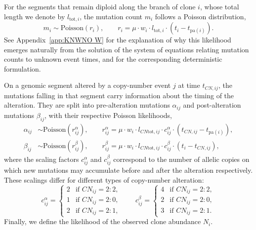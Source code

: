 For the segments that remain diploid along the branch of clone $i$, whose total length
we denote by $l_{\mathrm{tot},i}$, the mutation count $m_i$ follows a Poisson
distribution,
%
\begin{equation}
    m_i \sim \mathrm{Poisson}(r_i), \qquad
    r_i = \mu \cdot w_i \cdot l_{\mathrm{tot},i} \cdot (t_i - t_{\mathrm{pa}(i)}).
\end{equation}
%
See Appendix~\ref{app:KNWNO W} for the explanation of why this likelihood emerges
naturally from the solution of the system of equations relating mutation counts to
unknown event times, and for the corresponding deterministic formulation.

On a genomic segment altered by a copy-number event $j$ at time $t_{CN,ij}$, the
mutations falling in that segment carry information about the timing of the alteration.
They are split into pre-alteration mutations $\alpha_{ij}$ and post-alteration
mutations $\beta_{ij}$, with their respective Poisson likelihoods,
%
\begin{align}
    \alpha_{ij} &\sim \mathrm{Poisson}(r^\alpha_{ij}), \qquad
    r^\alpha_{ij} = \mu \cdot w_i \cdot l_{CN\mathrm{tot},ij} \cdot c^\alpha_{ij}
    \cdot (t_{CN,ij} - t_{\mathrm{pa}(i)}), \\[4pt]
    \beta_{ij} &\sim \mathrm{Poisson}(r^\beta_{ij}), \qquad
    r^\beta_{ij} = \mu \cdot w_i \cdot l_{CN\mathrm{tot},ij} \cdot c^\beta_{ij}
    \cdot (t_i - t_{CN,ij}),
\end{align}
%
where the scaling factors $c^\alpha_{ij}$ and $c^\beta_{ij}$ correspond to the
number of allelic copies on which new mutations may accumulate before and after
the alteration respectively. These scalings differ for different types of
copy-number alteration:
%
\begin{equation}
    c^\alpha_{ij} = \begin{cases} 
    2 & \text{if } CN_{ij} = 2\!:\!2, \\ 
    1 & \text{if } CN_{ij} = 2\!:\!0, \\ 
    2 & \text{if } CN_{ij} = 2\!:\!1,
    \end{cases}
    \qquad
    c^\beta_{ij} = \begin{cases} 
    4 & \text{if } CN_{ij} = 2\!:\!2, \\ 
    2 & \text{if } CN_{ij} = 2\!:\!0, \\ 
    3 & \text{if } CN_{ij} = 2\!:\!1.
    \end{cases}
\end{equation}
%
Finally, we define the likelihood of the observed clone abundance $N_i$.
